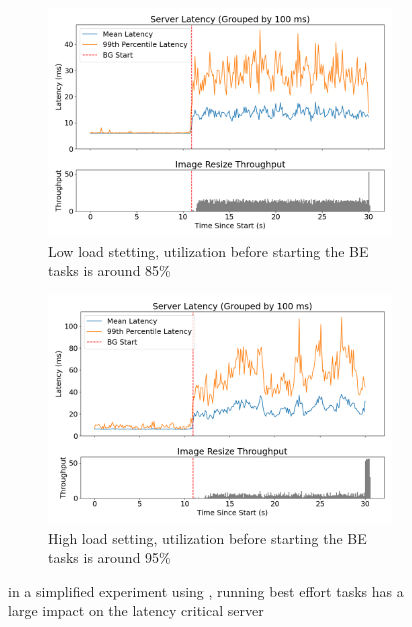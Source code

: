 \begin{figure}[t]
    \centering
    \begin{subfigure}{\columnwidth}
        \includegraphics[width=\columnwidth]{graphs/srv-bg-weight-low.png}
        \caption{Low load stetting, utilization before starting the BE tasks is
        around 85\%}\label{fig:srv-bg-weight-low}
        \vspace{12pt}
    \end{subfigure}
    \hspace{\fill}
    \begin{subfigure}{\columnwidth}
        \includegraphics[width=\columnwidth]{graphs/srv-bg-weight-high.png}
        \caption{High load setting, utilization before starting the BE tasks is
        around 95\%}\label{fig:srv-bg-weight-high}
    \end{subfigure}
    \vspace{4pt}
    \caption{in a simplified experiment using \cgroups{}, running best effort
    tasks has a large impact on the latency critical
    server}\label{fig:srv-bg-weight}
\end{figure}

